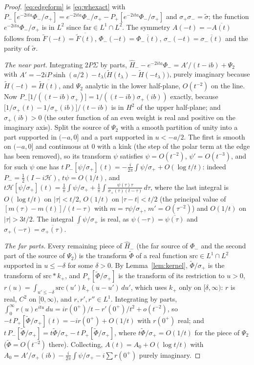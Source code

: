 \documentclass[11pt]{article}
\theoremstyle{definition}
\theoremstyle{remark}
\begin{document}
\begin{proof}
\eqref{eq:edgeform} is \eqref{eq:whexact} with $P_-[e^{-2ita}\Phi_-/\sigma_+]=e^{-2ita}\Phi_-/\sigma_+-P_+[e^{-2ita}\Phi_-/\sigma_+]$ and $\sigma_+\sigma_-=\tilde\sigma$; the function $e^{-2ita}\Phi_-/\sigma_+$ is in $L^2$ since $\mathrm{far}\in L^1\cap L^2$. The symmetry $A(-t)=-\overline{A(t)}$ follows from $\tilde F(-t)=\overline{\tilde F(t)}$, $\Phi_-(-t)=\overline{\Phi_-(t)}$, $\sigma_-(-t)=\overline{\sigma_-(t)}$ and the parity of $\tilde\sigma$.

\emph{The near part.} Integrating $2P\Sigma$ by parts, $\hat H_--e^{-2ita}\Phi_-=A'/(t-ib)+\Psi_2$ with $A'=-2iP\sinh(a/2)-t_\lambda\big(\tilde H(t_\lambda)-\tilde H(-t_\lambda)\big)$, purely imaginary because $\tilde H(-t)=\overline{\tilde H(t)}$, and $\Psi_2$ analytic in the lower half-plane, $O(t^{-2})$ on the line. Now $P_-\big[1/((t-ib)\sigma_+)\big]=1/((t-ib)\sigma_+(ib))$ exactly, because $\big[1/\sigma_+(t)-1/\sigma_+(ib)\big]/(t-ib)$ is in $H^2$ of the upper half-plane; and $\sigma_+(ib)>0$ (the outer function of an even weight is real and positive on the imaginary axis). Split the source of $\Psi_2$ with a smooth partition of unity into a part supported in $(-a,0]$ and a part supported in $u<-a/2$. The first is smooth on $(-a,0]$ and continuous at $0$ with a kink (the step of the polar term at the edge has been removed), so its transform $\psi$ satisfies $\psi=O(t^{-2})$, $\psi'=O(t^{-3})$, and for such $\psi$ one has $t\,P_-[\psi/\sigma_+](t)=-\frac i{2\pi}\int\psi/\sigma_++O(\log t/t)$: indeed $P_-=\frac12(I-i\mathcal H)$, $t\psi=O(1/t)$, and $t\mathcal H[\psi/\sigma_+](t)=\frac1\pi\int\psi/\sigma_++\frac1\pi\int\frac{\psi(\tau)\tau}{\sigma_+(\tau)(t-\tau)}\,d\tau$, where the last integral is $O(\log t/t)$ on $|\tau|<t/2$, $O(1/t)$ on $|\tau-t|<t/2$ (the principal value of $[m(\tau)-m(t)]/(t-\tau)$ with $m=\tau\psi/\sigma_+$, $m'=O(\tau^{-2})$) and $O(1/t)$ on $|\tau|>3t/2$. The integral $\int\psi/\sigma_+$ is real, as $\psi(-\tau)=\overline{\psi(\tau)}$ and $\sigma_+(-\tau)=\overline{\sigma_+(\tau)}$.

\emph{The far parts.} Every remaining piece of $\hat H_-$ (the far source of $\Phi_-$ and the second part of the source of $\Psi_2$) is the transform $\tilde\Phi$ of a real function $\mathrm{src}\in L^1\cap L^2$ supported in $u\le-\delta$ for some $\delta>0$. By Lemma~\ref{lem:kernel}, $\tilde\Phi/\sigma_+$ is the transform of $\mathrm{src}*k_+$, and $P_+[\tilde\Phi/\sigma_+]$ is the transform of its restriction to $u>0$, $r(u)=\int_{u'\le-\delta}\mathrm{src}(u')k_+(u-u')\,du'$, which uses $k_+$ only on $[\delta,\infty)$: $r$ is real, $C^2$ on $[0,\infty)$, and $r,r',r''\in L^1$. Integrating by parts, $\int_0^\infty r(u)e^{itu}\,du=ir(0^+)/t-r'(0^+)/t^2+o(t^{-2})$, so $-t\,P_+[\tilde\Phi/\sigma_+](t)=-ir(0^+)+O(1/t)$ with $r(0^+)$ real; and $t\,P_-[\tilde\Phi/\sigma_+]=t\tilde\Phi/\sigma_+-t\,P_+[\tilde\Phi/\sigma_+]$, where $t\tilde\Phi/\sigma_+=O(1/t)$ for the piece of $\Psi_2$ ($\tilde\Phi=O(t^{-2})$ there). Collecting, $A(t)=A_0+O(\log t/t)$ with $A_0=A'/\sigma_+(ib)-\frac i{2\pi}\int\psi/\sigma_+-i\sum r(0^+)$ purely imaginary.


\end{proof}
\end{document}

